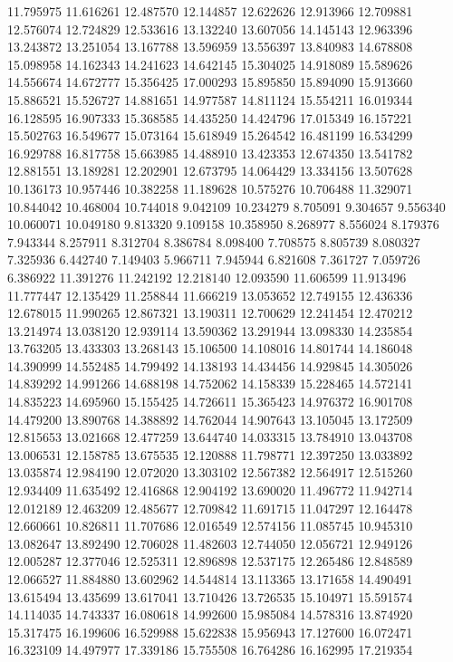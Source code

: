 11.795975
11.616261
12.487570
12.144857
12.622626
12.913966
12.709881
12.576074
12.724829
12.533616
13.132240
13.607056
14.145143
12.963396
13.243872
13.251054
13.167788
13.596959
13.556397
13.840983
14.678808
15.098958
14.162343
14.241623
14.642145
15.304025
14.918089
15.589626
14.556674
14.672777
15.356425
17.000293
15.895850
15.894090
15.913660
15.886521
15.526727
14.881651
14.977587
14.811124
15.554211
16.019344
16.128595
16.907333
15.368585
14.435250
14.424796
17.015349
16.157221
15.502763
16.549677
15.073164
15.618949
15.264542
16.481199
16.534299
16.929788
16.817758
15.663985
14.488910
13.423353
12.674350
13.541782
12.881551
13.189281
12.202901
12.673795
14.064429
13.334156
13.507628
10.136173
10.957446
10.382258
11.189628
10.575276
10.706488
11.329071
10.844042
10.468004
10.744018
9.042109
10.234279
8.705091
9.304657
9.556340
10.060071
10.049180
9.813320
9.109158
10.358950
8.268977
8.556024
8.179376
7.943344
8.257911
8.312704
8.386784
8.098400
7.708575
8.805739
8.080327
7.325936
6.442740
7.149403
5.966711
7.945944
6.821608
7.361727
7.059726
6.386922
11.391276
11.242192
12.218140
12.093590
11.606599
11.913496
11.777447
12.135429
11.258844
11.666219
13.053652
12.749155
12.436336
12.678015
11.990265
12.867321
13.190311
12.700629
12.241454
12.470212
13.214974
13.038120
12.939114
13.590362
13.291944
13.098330
14.235854
13.763205
13.433303
13.268143
15.106500
14.108016
14.801744
14.186048
14.390999
14.552485
14.799492
14.138193
14.434456
14.929845
14.305026
14.839292
14.991266
14.688198
14.752062
14.158339
15.228465
14.572141
14.835223
14.695960
15.155425
14.726611
15.365423
14.976372
16.901708
14.479200
13.890768
14.388892
14.762044
14.907643
13.105045
13.172509
12.815653
13.021668
12.477259
13.644740
14.033315
13.784910
13.043708
13.006531
12.158785
13.675535
12.120888
11.798771
12.397250
13.033892
13.035874
12.984190
12.072020
13.303102
12.567382
12.564917
12.515260
12.934409
11.635492
12.416868
12.904192
13.690020
11.496772
11.942714
12.012189
12.463209
12.485677
12.709842
11.691715
11.047297
12.164478
12.660661
10.826811
11.707686
12.016549
12.574156
11.085745
10.945310
13.082647
13.892490
12.706028
11.482603
12.744050
12.056721
12.949126
12.005287
12.377046
12.525311
12.896898
12.537175
12.265486
12.848589
12.066527
11.884880
13.602962
14.544814
13.113365
13.171658
14.490491
13.615494
13.435699
13.617041
13.710426
13.726535
15.104971
15.591574
14.114035
14.743337
16.080618
14.992600
15.985084
14.578316
13.874920
15.317475
16.199606
16.529988
15.622838
15.956943
17.127600
16.072471
16.323109
14.497977
17.339186
15.755508
16.764286
16.162995
17.219354
